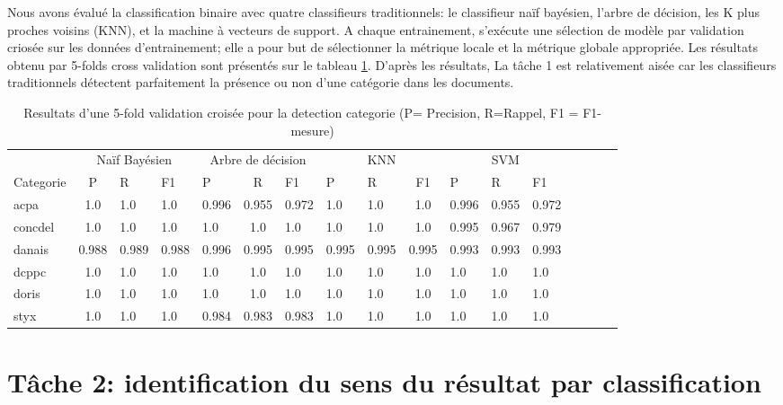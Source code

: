 Nous avons évalué la classification binaire avec quatre classifieurs traditionnels: le classifieur naïf bayésien, l'arbre de décision, les K plus proches voisins (KNN), et la machine à vecteurs de support. A chaque entrainement, s'exécute une sélection de modèle par validation criosée sur les données d'entrainement; elle a pour but de sélectionner la métrique locale et la métrique globale appropriée. Les résultats obtenu par 5-folds cross validation sont présentés sur le tableau \ref{tab:quanta:resultat-detect-cat}.  D'après les résultats, La tâche 1 est relativement aisée car les classifieurs traditionnels détectent parfaitement la présence ou non d'une catégorie dans les documents.

\begin{table}
\scriptsize
\centering
\begin{tabular}{l|c@{\hskip 0.1in}lllc@{\hskip 0.1in}lllc@{\hskip 0.1in}lllc@{\hskip 0.1in}lll}
\hline\noalign{\smallskip}
       &   \multicolumn{3}{c}{Naïf Bayésien}    &    \multicolumn{3}{c}{Arbre de décision}   &  \multicolumn{3}{c}{KNN}  & \multicolumn{3}{c}{SVM}     \\       
\noalign{\smallskip}
\hline
\noalign{\smallskip}
  Categorie  & P     & R     & F1    & P     & R     & F1    & P     & R     & F1    & P     & R     & F1    \\        
\noalign{\smallskip}
\hline
\noalign{\smallskip}
acpa    & 1.0 & 1.0 & 1.0 & 0.996 & 0.955 & 0.972 & 1.0 & 1.0 & 1.0 & 0.996 & 0.955 & 0.972 \\
concdel & 1.0 & 1.0 & 1.0 & 1.0 & 1.0 & 1.0 & 1.0 & 1.0 & 1.0 & 0.995 & 0.967 & 0.979 \\
danais  & 0.988 & 0.989 & 0.988 & 0.996 & 0.995 & 0.995 & 0.995 & 0.995 & 0.995 & 0.993 & 0.993 & 0.993 \\
dcppc   & 1.0 & 1.0 & 1.0 & 1.0 & 1.0 & 1.0 & 1.0 & 1.0 & 1.0 & 1.0 & 1.0 & 1.0 \\
doris   & 1.0 & 1.0 & 1.0 & 1.0 & 1.0 & 1.0 & 1.0 & 1.0 & 1.0 & 1.0 & 1.0 & 1.0 \\
styx    & 1.0 & 1.0 & 1.0 & 0.984 & 0.983 & 0.983 & 1.0 & 1.0 & 1.0 & 1.0 & 1.0 & 1.0 \\
\hline
\end{tabular}
\caption{Resultats d'une 5-fold validation croisée pour la detection categorie  (P= Precision, R=Rappel, F1 = F1-mesure)}\label{tab:quanta:resultat-detect-cat}
\end{table}


\section{Tâche 2: identification du sens du résultat par classification}

